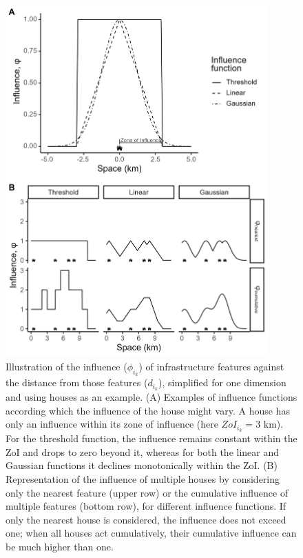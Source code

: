 \documentclass[titlepage]{article}
\begin{document}
\begin{figure}[h]
\centering
\includegraphics[width=0.9\textwidth]{figures/ZoI_conceptual.png}
\caption{\label{fig:zoi_conceptual} Illustration of the influence ($\phi_{i_k}$) of infrastructure features against the distance from those features ($d_{i_k}$), simplified for one dimension and using houses as an example. (A) Examples of influence functions according which the influence of the house might vary. A house has only an influence within its zone of influence (here $ZoI_{i_k} = 3 \text{ km}$). For the threshold function, the influence remains constant within the ZoI and drops to zero beyond it, whereas for both the linear and Gaussian functions it declines monotonically within the ZoI. 
(B) Representation of the influence of multiple houses by considering only the nearest feature (upper row) or the cumulative influence of multiple features (bottom row), for different influence functions. If only the nearest house is considered, the influence does not exceed one; when all houses act cumulatively, their cumulative influence can be much higher than one.}
\end{figure}
\end{document}
